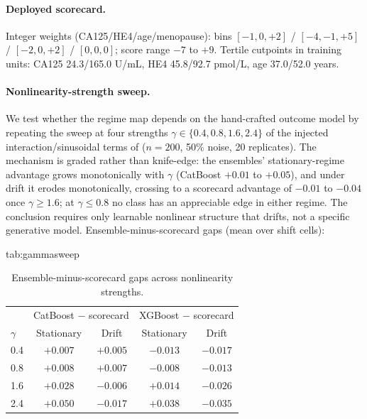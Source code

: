 \documentclass[pmlr,twocolumn,10pt]{jmlr} %
\begin{document}
\paragraph{Deployed scorecard.} Integer weights
(CA125/HE4/age/menopause): bins $[-1,0,+2]$ / $[-4,-1,+5]$ / $[-2,0,+2]$ /
$[0,0,0]$; score range $-7$ to $+9$. Tertile cutpoints in training units:
CA125 24.3/165.0 U/mL, HE4 45.8/92.7 pmol/L, age 37.0/52.0 years.

\paragraph{Nonlinearity-strength sweep.} We test whether the regime map
depends on the hand-crafted outcome model by repeating the sweep at four
strengths $\gamma\in\{0.4,0.8,1.6,2.4\}$ of the injected
interaction/sinusoidal terms of  ($n=200$, 50\% noise,
20 replicates). The
mechanism is graded rather than knife-edge: the ensembles'
stationary-regime advantage grows monotonically with $\gamma$ (CatBoost
$+0.01$ to $+0.05$), and under drift it erodes monotonically, crossing to a
scorecard advantage of $-0.01$ to $-0.04$ once $\gamma\ge1.6$; at
$\gamma\le0.8$ no class has an appreciable edge in either regime. The
conclusion requires only learnable nonlinear structure that drifts, not a
specific generative model. Ensemble-minus-scorecard gaps (mean over shift
cells):

\begin{table}[h]
\floatconts
  {tab:gammasweep}
  {\caption{Ensemble-minus-scorecard gaps across nonlinearity strengths.}}
  {\small\begin{tabular}{lcccc}
  \toprule
  & \multicolumn{2}{c}{CatBoost $-$ scorecard} & \multicolumn{2}{c}{XGBoost $-$ scorecard}\\
  $\gamma$ & Stationary & Drift & Stationary & Drift\\
  \midrule
  0.4 & $+0.007$ & $+0.005$ & $-0.013$ & $-0.017$\\
  0.8 & $+0.008$ & $+0.007$ & $-0.008$ & $-0.013$\\
  1.6 & $+0.028$ & $-0.006$ & $+0.014$ & $-0.026$\\
  2.4 & $+0.050$ & $-0.017$ & $+0.038$ & $-0.035$\\
  \bottomrule
  \end{tabular}}
\end{table}
\end{document}
